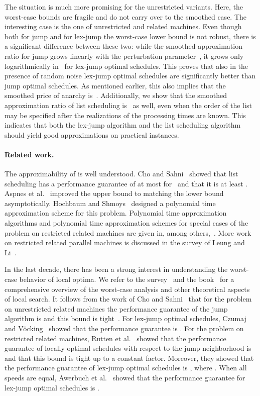 \documentclass[a4paper,11pt,fleqn]{article}
\begin{document}
The situation is much more promising for the unrestricted variants.
Here, the worst-case bounds are fragile and do not carry over to the smoothed
case. The interesting case is the one of unrestricted and related machines. Even though
both for jump and for lex-jump the worst-case lower bound is not robust,
there is a significant difference between these two: while the smoothed
approximation ratio for jump grows linearly with the perturbation parameter~,
it grows only logarithmically in~ for lex-jump optimal schedules.
This proves that also in the presence of random noise lex-jump optimal schedules
are significantly better than jump optimal schedules. As mentioned earlier, this also implies
that the smoothed price of anarchy is~. Additionally, we
show that the smoothed approximation ratio of list scheduling
is~ as well, even when the order of the list may be
specified after the realizations of the processing times are known.
 This indicates that both the lex-jump algorithm and the list scheduling algorithm should yield good
approximations on practical instances.

\paragraph{Related work.}
The approximability of  is well understood. Cho and
Sahni~\cite{Cho+Sahni:1980} showed that list scheduling has a
performance guarantee of at most  for~ and
that it is at least . Aspnes et al.~\cite{DBLP:journals/jacm/AspnesAFPW97} improved the upper bound to  matching the lower bound asymptotically. Hochbaum and
Shmoys~\cite{Hochbaum+Shmoys:1988} designed a polynomial time
approximation scheme for this problem. Polynomial time approximation algorithms and polynomial time
approximation schemes for special cases of the problem on restricted
related machines are given in, among others,~\cite{Li06,Glass07,Ou08}.
More work on restricted related parallel machines is discussed in the
survey of Leung and Li~\cite{Leung08}.

In the last decade, there has been a strong interest in understanding
the worst-case behavior of local optima. We
refer to the survey~\cite{Angel:2006} and the
book~\cite{Michiels:etal:2007} for a comprehensive overview of the worst-case analysis
and other theoretical aspects of local search. 
It follows from the work of Cho and Sahni~\cite{Cho+Sahni:1980} that for
the problem on unrestricted related machines the performance guarantee
of the jump algorithm is  and this bound is
tight~\cite{Schuurman:Vredeveld:2007}. For lex-jump optimal
schedules, Czumaj and V\"ocking~\cite{Voecking:2007} showed that the performance guarantee is
.
For the problem on restricted related machines, Rutten et
al.~\cite{Rutten:etal:2012} showed that the performance guarantee of locally optimal schedules with
respect to the jump neighborhood is  and
that this bound is tight up to a constant factor. Moreover, they showed
that the performance guarantee of lex-jump optimal schedules is
, where .
When all speeds are equal, Awerbuch et al.~\cite{Awerbuch+etal:2006}
showed that the performance guarantee for lex-jump optimal schedules is
.
\end{document}
